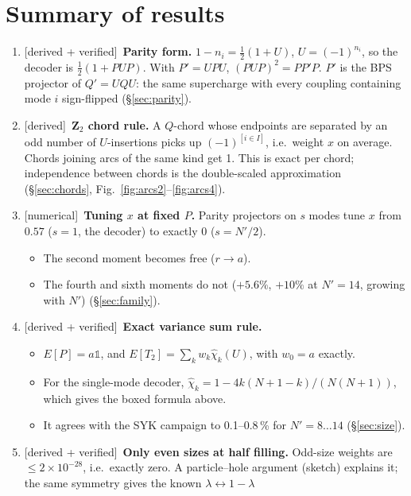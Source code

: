 \documentclass[11pt]{article}
\newcommand{\Np}{N'}
\newcommand{\one}{\mathds 1}
\newcommand{\tagbox}[2]{\textsf{\small\color{#1}[#2]}}
\newcommand{\DER}{\tagbox{cder}{derived}}
\newcommand{\VER}{\tagbox{cder}{derived + verified}}
\newcommand{\NUM}{\tagbox{cnum}{numerical}}
\theoremstyle{remark}
\begin{document}
\tableofcontents

\section{Summary of results}
\begin{enumerate}\itemsep3pt
\item \VER\ \textbf{Parity form.} $1-n_i=\frac12(1+U)$, $U=(-1)^{n_i}$, so the decoder is $\frac12(1+PUP)$. With
  $P'=UPU$, $(PUP)^2=PP'P$. $P'$ is the BPS projector of $Q'=UQU$: the same supercharge with every coupling containing
  mode $i$ sign-flipped (\S\ref{sec:parity}).
\item \DER\ \textbf{Z$_2$ chord rule.} A $Q$-chord whose endpoints are separated by an odd number of $U$-insertions
  picks up $(-1)^{[i\in I]}$, i.e.\ weight $x$ on average. Chords joining arcs of the same kind get 1. This is exact
  per chord; independence between chords is the double-scaled approximation (\S\ref{sec:chords},
  Fig.~\ref{fig:arcs2}--\ref{fig:arcs4}).
\item \NUM\ \textbf{Tuning $x$ at fixed $P$.} Parity projectors on $s$ modes tune $x$ from $0.57$ ($s=1$, the
  decoder) to exactly $0$ ($s=\Np/2$).
  \begin{itemize}\itemsep1pt
  \item The second moment becomes free ($r\to a$).
  \item The fourth and sixth moments do not ($+5.6\%$, $+10\%$ at $\Np=14$, growing with $\Np$)
    (\S\ref{sec:family}).
  \end{itemize}
\item \VER\ \textbf{Exact variance sum rule.}
  \begin{itemize}\itemsep1pt
  \item $E[P]=a\one$, and $E[T_2]=\sum_kw_k\hat\chi_k(U)$, with $w_0=a$ exactly.
  \item For the single-mode decoder, $\hat\chi_k=1-4k(N+1-k)/(N(N+1))$, which gives the boxed formula above.
  \item It agrees with the SYK campaign to 0.1--0.8\,\% for $\Np=8\ldots14$ (\S\ref{sec:size}).
  \end{itemize}
\item \VER\ \textbf{Only even sizes at half filling.} Odd-size weights are $\le2\times10^{-28}$, i.e.\ exactly zero.
  A particle--hole argument (sketch) explains it; the same symmetry gives the known $\lambda\leftrightarrow1-\lambda$

\end{enumerate}
\end{document}
